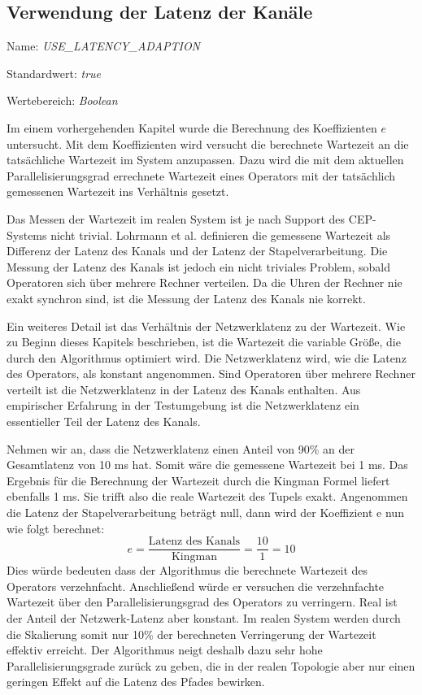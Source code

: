 \subsection{Verwendung der Latenz der Kanäle}

Name: \textit{USE\_LATENCY\_ADAPTION}

Standardwert: \textit{true}

Wertebereich: \textit{Boolean}

Im einem vorhergehenden Kapitel wurde die Berechnung des Koeffizienten \(e\) untersucht.
Mit dem Koeffizienten wird versucht die berechnete Wartezeit an die tatsächliche Wartezeit im System anzupassen.
Dazu wird die mit dem aktuellen Parallelisierungsgrad errechnete Wartezeit eines Operators mit der tatsächlich gemessenen Wartezeit ins Verhältnis gesetzt.

Das Messen der Wartezeit im realen System ist je nach Support des CEP-Systems nicht trivial.
Lohrmann et al. definieren die gemessene Wartezeit als Differenz der Latenz des Kanals und der Latenz der Stapelverarbeitung.
Die Messung der Latenz des Kanals ist jedoch ein nicht triviales Problem, sobald Operatoren sich über mehrere Rechner verteilen.
Da die Uhren der Rechner nie exakt synchron sind, ist die Messung der Latenz des Kanals nie korrekt.

Ein weiteres Detail ist das Verhältnis der Netzwerklatenz zu der Wartezeit.
Wie zu Beginn dieses Kapitels beschrieben, ist die Wartezeit die variable Größe, die durch den Algorithmus optimiert wird.
Die Netzwerklatenz wird, wie die Latenz des Operators, als konstant angenommen.
Sind Operatoren über mehrere Rechner verteilt ist die Netzwerklatenz in der Latenz des Kanals enthalten.
Aus empirischer Erfahrung in der Testumgebung ist die Netzwerklatenz ein essentieller Teil der Latenz des Kanals.

Nehmen wir an, dass die Netzwerklatenz einen Anteil von 90\% an der Gesamtlatenz von 10 ms hat.
Somit wäre die gemessene Wartezeit bei 1 ms.
Das Ergebnis für die Berechnung der Wartezeit durch die Kingman Formel liefert ebenfalls 1 ms.
Sie trifft also die reale Wartezeit des Tupels exakt.
Angenommen die Latenz der Stapelverarbeitung beträgt null, dann wird der Koeffizient e nun wie folgt berechnet:
\[ e = \frac{\text{Latenz des Kanals}}{\text{Kingman}} = \frac{10}{1} = 10\]
Dies würde bedeuten dass der Algorithmus die berechnete Wartezeit des Operators verzehnfacht.
Anschließend würde er versuchen die verzehnfachte Wartezeit über den Parallelisierungsgrad des Operators zu verringern.
Real ist der Anteil der Netzwerk-Latenz aber konstant.
Im realen System werden durch die Skalierung somit nur 10\% der berechneten Verringerung der Wartezeit effektiv erreicht.
Der Algorithmus neigt deshalb dazu sehr hohe Parallelisierungsgrade zurück zu geben, die in der realen Topologie aber nur einen geringen Effekt auf die Latenz des Pfades bewirken.

